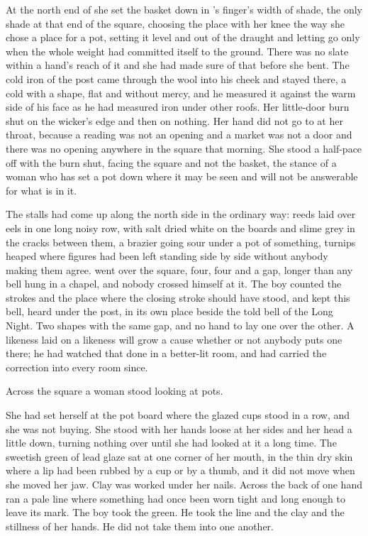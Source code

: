 At the north end of  she set the basket down in 's finger's width of shade, the only shade at that end of the square, choosing the place with her knee the way she chose a place for a pot, setting it level and out of the draught and letting go only when the whole weight had committed itself to the ground. There was no slate within a hand's reach of it and she had made sure of that before she bent. The cold iron of the post came through the wool into his cheek and stayed there, a cold with a shape, flat and without mercy, and he measured it against the warm side of his face as he had measured iron under other roofs. Her little-door burn shut on the wicker's edge and then on nothing. Her hand did not go to  at her throat, because a reading was not an opening and a market was not a door and there was no opening anywhere in the square that morning. She stood a half-pace off with the burn shut, facing the square and not the basket, the stance of a woman who has set a pot down where it may be seen and will not be answerable for what is in it.

The stalls had come up along the north side in the ordinary way: reeds laid over eels in one long noisy row, with salt dried white on the boards and slime grey in the cracks between them, a brazier going sour under a pot of something, turnips heaped where figures had been left standing side by side without anybody making them agree.  went over the square, four, four and a gap, longer than any bell hung in a chapel, and nobody crossed himself at it. The boy counted the strokes and the place where the closing stroke should have stood, and kept this bell, heard under the post, in its own place beside the told bell of the Long Night. Two shapes with the same gap, and no hand to lay one over the other. A likeness laid on a likeness will grow a cause whether or not anybody puts one there; he had watched that done in a better-lit room, and had carried the correction into every room since.

\scenebreak

Across the square a woman stood looking at pots.

She had set herself at the pot board where the glazed cups stood in a row, and she was not buying. She stood with her hands loose at her sides and her head a little down, turning nothing over until she had looked at it a long time. The sweetish green of lead glaze sat at one corner of her mouth, in the thin dry skin where a lip had been rubbed by a cup or by a thumb, and it did not move when she moved her jaw. Clay was worked under her nails. Across the back of one hand ran a pale line where something had once been worn tight and long enough to leave its mark. The boy took the green. He took the line and the clay and the stillness of her hands. He did not take them into one another.

